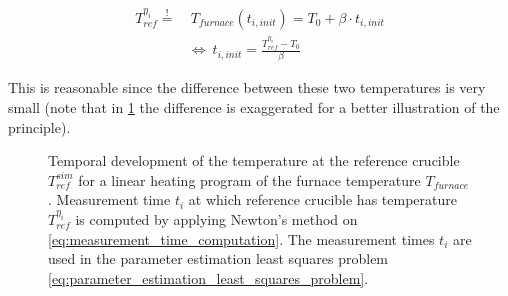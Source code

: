\documentclass{scrartcl}[12pt, halfparskip]
\numberwithin{equation}{section}
\numberwithin{figure}{section}
\numberwithin{table}{section}
\begin{document}
\begin{align}
	T_{ref}^{\eta_i} \stackrel{!}{=} & \ T_{furnace}(t_{i,init}) = T_0 + \beta \cdot t_{i,init} \nonumber \\
	& \Leftrightarrow \ t_{i,init} = \frac{T_{ref}^{\eta_i} - T_0}{\beta}
\end{align}

This is reasonable since the difference between these two temperatures is very small (note that in \cref{fig:obtaining_measurement_times} the difference is exaggerated for a better illustration of the principle). \\


\begin{figure}[H]
	\centering
	\caption{Temporal development of the temperature at the reference crucible $T_{ref}^{sim}$ for a linear heating program of the furnace temperature $T_{furnace}$. Measurement time $t_i$ at which reference crucible has temperature $T_{ref}^{\eta_i}$ is computed by applying Newton's method on \cref{eq:measurement_time_computation}. The measurement times $t_i$ are used in the parameter estimation least squares problem \cref{eq:parameter_estimation_least_squares_problem}.}
	\label{fig:obtaining_measurement_times}
\end{figure}
\end{document}
